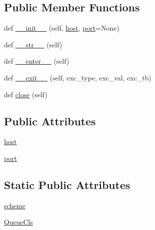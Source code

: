 \subsection*{Public Member Functions}
\begin{DoxyCompactItemize}
\item 
def \hyperlink{classpip_1_1__vendor_1_1urllib3_1_1connectionpool_1_1ConnectionPool_afccdc920fdf3e2af53f8c1c1316a0d51}{\+\_\+\+\_\+init\+\_\+\+\_\+} (self, \hyperlink{classpip_1_1__vendor_1_1urllib3_1_1connectionpool_1_1ConnectionPool_a96f7b726b786cd4dcb95148eaf744173}{host}, \hyperlink{classpip_1_1__vendor_1_1urllib3_1_1connectionpool_1_1ConnectionPool_a94af8217ab998da72b40c21c21a80b5a}{port}=None)
\item 
def \hyperlink{classpip_1_1__vendor_1_1urllib3_1_1connectionpool_1_1ConnectionPool_a901bfc7593462939683bc1e798d9d1f7}{\+\_\+\+\_\+str\+\_\+\+\_\+} (self)
\item 
def \hyperlink{classpip_1_1__vendor_1_1urllib3_1_1connectionpool_1_1ConnectionPool_a2cce35cb6693cc4ada970cbc83212b58}{\+\_\+\+\_\+enter\+\_\+\+\_\+} (self)
\item 
def \hyperlink{classpip_1_1__vendor_1_1urllib3_1_1connectionpool_1_1ConnectionPool_a68ff9060a12413aebcb49d08091a75ca}{\+\_\+\+\_\+exit\+\_\+\+\_\+} (self, exc\+\_\+type, exc\+\_\+val, exc\+\_\+tb)
\item 
def \hyperlink{classpip_1_1__vendor_1_1urllib3_1_1connectionpool_1_1ConnectionPool_a6c68625e3f94a48581a7685ca3677e47}{close} (self)
\end{DoxyCompactItemize}
\subsection*{Public Attributes}
\begin{DoxyCompactItemize}
\item 
\hyperlink{classpip_1_1__vendor_1_1urllib3_1_1connectionpool_1_1ConnectionPool_a96f7b726b786cd4dcb95148eaf744173}{host}
\item 
\hyperlink{classpip_1_1__vendor_1_1urllib3_1_1connectionpool_1_1ConnectionPool_a94af8217ab998da72b40c21c21a80b5a}{port}
\end{DoxyCompactItemize}
\subsection*{Static Public Attributes}
\begin{DoxyCompactItemize}
\item 
\hyperlink{classpip_1_1__vendor_1_1urllib3_1_1connectionpool_1_1ConnectionPool_ab899324f3848aae48a8e381b1be109ec}{scheme}
\item 
\hyperlink{classpip_1_1__vendor_1_1urllib3_1_1connectionpool_1_1ConnectionPool_a2eb44c91311bb599dcecc513c1080cc3}{Queue\+Cls}
\end{DoxyCompactItemize}


